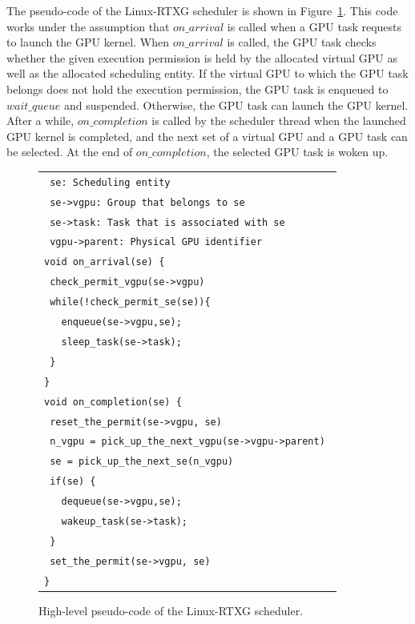 The pseudo-code of the Linux-RTXG scheduler is shown in Figure~\ref{fig:scheduling}.
This code works under the assumption that $on\_arrival$ is called when a GPU task requests to launch the GPU kernel.
When $on\_arrival$ is called, the GPU task checks whether the given execution permission is held by the allocated virtual GPU as well as the allocated scheduling entity.
If the virtual GPU to which the GPU task belongs does not hold the execution permission, the GPU task is enqueued to $wait\_queue$ and suspended.
Otherwise, the GPU task can launch the GPU kernel.
After a while, $on\_completion$ is called by the scheduler thread when the launched GPU kernel is completed, and the next set of a virtual GPU and a GPU task can be selected.
At the end of $on\_completion$, the selected GPU task is woken up.

\begin{figure}[!t]
\begin{center}
\begin{tabular}{l}
\hline
{\scriptsize \verb| se: Scheduling entity |}\\
{\scriptsize \verb| se->vgpu: Group that belongs to se|}\\
{\scriptsize \verb| se->task: Task that is associated with se |}\\
{\scriptsize \verb| vgpu->parent: Physical GPU identifier|}\\
\hline
{\scriptsize \verb|void on_arrival(se) {|}\\
{\scriptsize \verb| check_permit_vgpu(se->vgpu)    |}\\
{\scriptsize \verb| while(!check_permit_se(se)){|}\\
{\scriptsize \verb|   enqueue(se->vgpu,se); |}\\
{\scriptsize \verb|   sleep_task(se->task); |}\\
{\scriptsize \verb| }|}\\
{\scriptsize \verb|}|}\\
{\scriptsize \verb|void on_completion(se) {|}\\
{\scriptsize \verb| reset_the_permit(se->vgpu, se)|}\\
{\scriptsize \verb| n_vgpu = pick_up_the_next_vgpu(se->vgpu->parent) |}\\
{\scriptsize \verb| se = pick_up_the_next_se(n_vgpu)|}\\
{\scriptsize \verb| if(se) {|}\\
{\scriptsize \verb|   dequeue(se->vgpu,se);|}\\
{\scriptsize \verb|   wakeup_task(se->task);|}\\
{\scriptsize \verb| }|}\\
{\scriptsize \verb| set_the_permit(se->vgpu, se)|}\\
{\scriptsize \verb|}|}\\
\hline
\end{tabular}
\caption{High-level pseudo-code of the Linux-RTXG scheduler.}
\label{fig:scheduling}
\end{center}
\end{figure}

